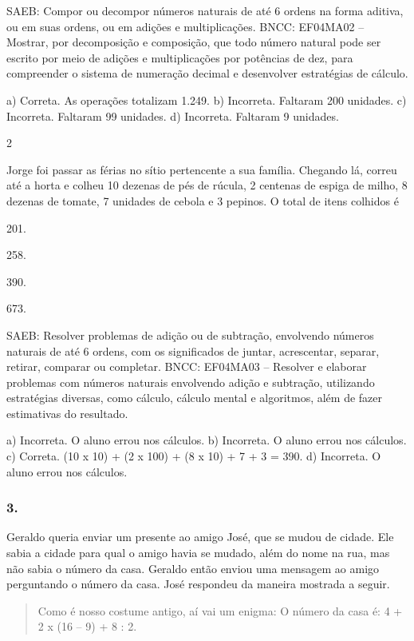 \begin{mdframed}[linewidth=2pt,linecolor=salmao,roundcorner=2pt]
\begin{escolha}
{\begin{escolha}
SAEB: Compor ou decompor números naturais de até 6 ordens na
forma aditiva, ou em suas ordens, ou em adições e multiplicações.
BNCC: EF04MA02 -- Mostrar, por decomposição e composição, que todo número natural pode ser escrito
por meio de adições e multiplicações por potências de dez, para compreender o sistema de
numeração decimal e desenvolver estratégias de cálculo.

a) Correta. As operações totalizam 1.249.
b) Incorreta. Faltaram 200 unidades.
c) Incorreta. Faltaram 99 unidades.
d) Incorreta. Faltaram 9 unidades.

\num{2}

Jorge foi passar as férias no sítio pertencente a sua família. Chegando lá,
correu até a horta e colheu 10 dezenas de pés de rúcula, 2 centenas de
espiga de milho, 8 dezenas de tomate, 7 unidades de cebola e 3 pepinos.
O total de itens colhidos é

\begin{escolha}
\item
  201.
\item
  258.
\item
  390.
\item
  673.
\end{escolha}

SAEB: Resolver problemas de adição ou de subtração,
envolvendo números naturais de até 6 ordens, com os significados de
juntar, acrescentar, separar, retirar, comparar ou completar.
BNCC: EF04MA03 -- Resolver e elaborar problemas com números naturais envolvendo adição e subtração,
utilizando estratégias diversas, como cálculo, cálculo mental e algoritmos, além de fazer estimativas
do resultado.

a) Incorreta. O aluno errou nos cálculos.
b) Incorreta. O aluno errou nos cálculos.
c) Correta. (10 x 10) + (2 x 100) + (8 x 10) + 7 + 3 = 390.
d) Incorreta. O aluno errou nos cálculos.

\subsubsection{3. }

Geraldo queria enviar um presente ao amigo José, que se mudou de cidade. Ele
sabia a cidade para qual o amigo havia se mudado, além do nome na rua, mas
não sabia o número da casa. Geraldo então enviou uma mensagem ao
amigo perguntando o número da casa. José respondeu da maneira mostrada a seguir.

\begin{quote}
Como é nosso costume antigo, aí vai um enigma:
O número da casa é: 4 + 2 x (16 -- 9) + 8 : 2.
\end{quote}


\end{escolha}}
\end{escolha}
\end{mdframed}
